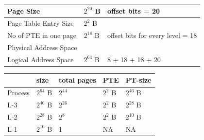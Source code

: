 \begin{enumerate}
\begin{minipage}{\linewidth}
  \begin{myTableStyle}
    \begin{tabular}{ |m{4cm}|m{1cm}|m{5cm}| } \hline
        Page Size               &   \(2^{20}\) B  & offset bits = 20        \\ \hline
        Page Table Entry Size   &   \(2^{2}\)  B  &                         \\ \hline
        No of PTE in one page   &   \(2^{18}\) B  & offset bits for every level = 18        \\ \hline
        Physical Address Space  &                 &                          \\ \hline
        Logical Address Space   &   \(2^{64}\) B  & 8 + 18 + 18 + 20            \\ \hline
    \end{tabular}
  \end{myTableStyle}
  \vspace{0.08in}

    \begin{myTableStyle}
      \begin{tabular}{ |m{2cm}|m{2cm}|m{2cm}|m{2cm}|m{2cm}| } \hline
                  &  size           & total pages   & PTE         &  PT-size        \\ \hline
          Process &  \(2^{64}\) B   &  \(2^{44}\)   &  \(2^2\) B  &  \(2^{46}\) B   \\ \hline
          L-3     &  \(2^{46}\) B   &  \(2^{26}\)   &  \(2^2\) B  &  \(2^{28}\) B   \\ \hline
          L-2     &  \(2^{28}\) B   &  \(2^{8}\)    &  \(2^2\) B  &  \(2^{10}\) B   \\ \hline
          L-1     &  \(2^{10}\) B   &  1            &  NA         &  NA             \\ \hline
      \end{tabular}
    \end{myTableStyle}
    \vspace{0.08in}

    \end{minipage}


\end{enumerate}








